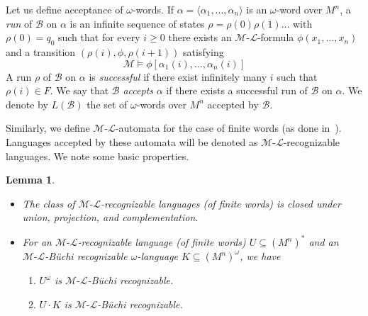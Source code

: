 \documentclass[copyright,creativecommons]{eptcs}
\newtheorem{lemma}[theorem]{Lemma}
\theoremstyle{plain}
\theoremstyle{nonumberplain}
\newcommand{\m}{\ensuremath{\mathcal{M}}}
\newcommand{\el}{\ensuremath{\mathcal{L}}}
\newcommand{\ml}{\ensuremath{\m\textrm{-}\el}}
\begin{document}
Let us define acceptance of $\omega$-words. If 
$\alpha = \langle \alpha_1, \ldots, \alpha_n \rangle$ is an $\omega$-word over $M^n$,  
a \emph{run} of $\mathcal{B}$ on $\alpha$ is an infinite sequence of states 
$\rho = \rho(0)\rho(1) \dots$ with $\rho(0)=q_0$ such that for every $i \geq 0$ there 
exists an \ml-formula $\phi(x_1,\dots,x_n)$ and a transition $(\rho(i),\phi,\rho(i+1))$ satisfying
$$\m \models \phi[\alpha_1(i),\ldots,\alpha_n(i)]$$
A run $\rho$ of $\mathcal{B}$ on $\alpha$ is \emph{successful} 
if there exist infinitely many $i$ such that $\rho(i) \in F$. We say that $\mathcal{B}$ \emph{accepts} $\alpha$ if there exists a successful run of $\mathcal{B}$ on $\alpha$. 
We denote by $L(\mathcal{B})$ the set of $\omega$-words over $M^n$ accepted by $\mathcal{B}$.

Similarly, we define \ml-automata for the case of finite words (as done in~\cite{bes08}). 
Languages accepted by these automata will be denoted as \ml-recognizable languages. 
We note some basic properties. 
\begin{lemma}\label{lem:mlprops}\ 
\begin{itemize}
  \item The class of \ml-recognizable languages (of finite words) is closed under union, projection, and complementation.
  \item For an \ml-recognizable language (of finite words) $U \subseteq (M^n)^*$ and an \ml-B{\"u}chi recognizable $\omega$-language $K \subseteq (M^n)^{\omega}$, we have 
    \begin{enumerate}
    \item $U^{\omega}$ is \ml-B{\"u}chi recognizable.
    \item $U \cdot K$ is \ml-B{\"u}chi recognizable.
  \end{enumerate}
\end{itemize}
\end{lemma}
\end{document}
